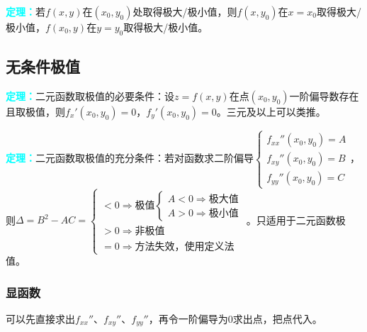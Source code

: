 \documentclass[UTF8, 12pt]{ctexart}
\begin{document}
        \textcolor{aqua}{\textbf{定理：}}若$f(x,y)$在$(x_0,y_0)$处取得极大/极小值，则$f(x,y_0)$在$x=x_0$取得极大/极小值，$f(x_0,y)$在$y=y_0$取得极大/极小值。

        \subsection{无条件极值}

        \textcolor{aqua}{\textbf{定理：}}二元函数取极值的必要条件：设$z=f(x,y)$在点$(x_0,y_0)$一阶偏导数存在且取极值，则$f_x'(x_0,y_0)=0$，$f_y'(x_0,y_0)=0$。三元及以上可以类推。

        \textcolor{aqua}{\textbf{定理：}}二元函数取极值的充分条件：若对函数求二阶偏导$\left\{\begin{array}{l}
                                                                                               f_{xx}''(x_0,y_0)=A \\
                                                                                               f_{xy}''(x_0,y_0)=B \\
                                                                                               f_{yy}''(x_0,y_0)=C
        \end{array}\right.$，则$\Delta=B^2-AC=\left\{\begin{array}{l}
                                                        <0\Rightarrow\text{极值}\left\{\begin{array}{l}
                                                                                           A<0\Rightarrow\text{极大值} \\
                                                                                           A>0\Rightarrow\text{极小值}
                                                        \end{array}\right. \\
                                                        >0\Rightarrow\text{非极值} \\
                                                        =0\Rightarrow\text{方法失效，使用定义法}
        \end{array}\right.$。只适用于二元函数极值。

        \subsubsection{显函数}

        可以先直接求出$f_{xx}''$、$f_{xy}''$、$f_{yy}''$，再令一阶偏导为0求出点，把点代入。
\end{document}
